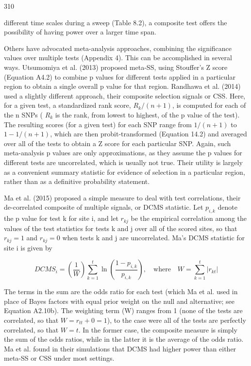 \documentclass{article}
\begin{document}
310

different time scales during a sweep (Table 8.2), a composite test offers the possibility of having power over a larger time span.

Others have advocated meta-analysis approaches, combining the significance values over multiple tests (Appendix 4). This can be accomplished in several ways. Utsumomiya et al. (2013) proposed meta-SS, using Stouffer's Z score (Equation A4.2) to combine p values for different tests applied in a particular region to obtain a single overall p value for that region. Randhawa et al. (2014) used a slightly different approach, their composite selection signals or CSS. Here, for a given test, a standardized rank score,  $ R_k/(n+1) $, is computed for each of the n SNPs ( $ R_k $ is the rank, from lowest to highest, of the p value of the test). The resulting scores (for a given test) for each SNP range from  $ 1/(n+1) $ to  $ 1-1/(n+1) $, which are then probit-transformed (Equation 14.2) and averaged over all of the tests to obtain a Z score for each particular SNP. Again, such meta-analysis p values are only approximations, as they assume the p values for different tests are uncorrelated, which is usually not true. Their utility is largely as a convenient summary statistic for evidence of selection in a particular region, rather than as a definitive probability statement.

Ma et al. (2015) proposed a simple measure to deal with test correlations, their de-correlated composite of multiple signals, or DCMS statistic. Let  $ p_{i,k} $ denote the p value for test k for site i, and let  $ r_{kj} $ be the empirical correlation among the values of the test statistics for tests k and j over all of the scored sites, so that  $ r_{kj} = 1 $ and  $ r_{kj} = 0 $ when tests k and j are uncorrelated. Ma's DCMS statistic for site i is given by

\begin{equation}
DCMS_{i}=\left(\frac{1}{W}\right)\sum_{k=1}^{t}\ln\left(\frac{1-p_{i,k}}{p_{i,k}}\right),\quad\mathrm{w h e r e}\quad W=\sum_{k=1}^{t}\left|r_{k t}\right|
\tag{9.29a}
\label{eq:9_29a}
\end{equation}

The terms in the sum are the odds ratio for each test (which Ma et al. used in place of Bayes factors with equal prior weight on the null and alternative; see Equation A2.10b). The weighting term (W) ranges from 1 (none of the tests are correlated, so that  $ W = r_{tt} + 0 = 1 $), to the case were all of the tests are perfectly correlated, so that  $ W = t $. In the former case, the composite measure is simply the sum of the odds ratios, while in the latter it is the average of the odds ratio. Ma et al. found in their simulations that DCMS had higher power than either meta-SS or CSS under most settings.
\end{document}
